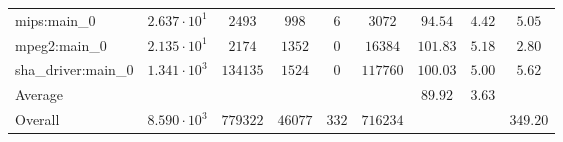 \begin{tabular}{|l|c|c|c|c|c|c|c|c|}
mips:main\_0            & $ 2.637 \cdot 10^{1} $ & $ 2493   $ & $ 998   $ & $ 6   $ & $ 3072   $ & $ 94.54       $ & $ 4.42    $ & $ 5.05    $ \\
mpeg2:main\_0           & $ 2.135 \cdot 10^{1} $ & $ 2174   $ & $ 1352  $ & $ 0   $ & $ 16384  $ & $ 101.83      $ & $ 5.18    $ & $ 2.80    $ \\
sha\_driver:main\_0     & $ 1.341 \cdot 10^{3} $ & $ 134135 $ & $ 1524  $ & $ 0   $ & $ 117760 $ & $ 100.03      $ & $ 5.00    $ & $ 5.62    $ \\
\hline
Average                 & $                    $ & $        $ & $       $ & $     $ & $        $ & $ 89.92       $ & $ 3.63    $ & $         $ \\
\hline
Overall                 & $ 8.590 \cdot 10^{3} $ & $ 779322 $ & $ 46077 $ & $ 332 $ & $ 716234 $ & $             $ & $         $ & $ 349.20  $ \\
\hline
\end{tabular}
